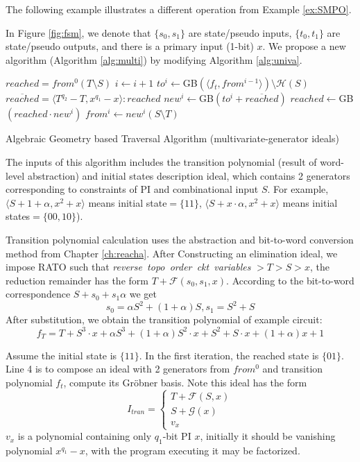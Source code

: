 The following example illustrates a different operation from Example \ref{ex:SMPO}.
\begin{Example}
In Figure \ref{fig:fsm}, we denote that
$\{s_0, s_1\}$ are state/pseudo inputs, $\{t_0,t_1\}$ are state/pseudo outputs, and there is a primary input (1-bit) 
$x$. We propose a new algorithm (Algorithm \ref{alg:multi}) by modifying Algorithm \ref{alg:univa}.

\IncMargin{1em}
\begin{algorithm}[hbt]
\SetAlgoNoLine
\LinesNumbered
  $reached = from^0(T\setminus S)$\;
  {
  	$i \gets i + 1$\;
	$to^i \gets$GB$(\langle f_t, from^{i-1}\rangle) \setminus \mathcal H(S)$\;
	$\overline{reached} = \langle T^{q_2}-T, x^{q_1} - x \rangle : reached$\;
	$new^i \gets $GB$(to^i + \overline{reached})$\;
  	$reached \gets $GB$( reached \cdot new^i)$\;
	$from^i \gets new^i(S\setminus T)$\;
  }
\caption {Algebraic Geometry based Traversal Algorithm (multivariate-generator ideals)}\label{alg:multi}
\end{algorithm}
\DecMargin{1em}

The inputs of this algorithm includes the transition polynomial (result of word-level abstraction) and initial 
states description ideal, which contains 2 generators corresponding to constraints of PI and combinational input $S$. 
For example, $\langle S+1+\alpha, x^2+x\rangle$ means initial state$=\{11\}$,
$\langle S+x\cdot\alpha, x^2+x\rangle$ means initial states$=\{00,10\}$).

Transition polynomial calculation uses the abstraction and bit-to-word conversion method from 
Chapter \ref{ch:reacha}. After Constructing
an elimination ideal, we impose RATO such that \textit{reverse\ topo\ order\ ckt\ variables }$> T > S > x$, the reduction
remainder has the form $T+\mathcal F(s_0,s_1,x)$. According to the bit-to-word correspondence $S+s_0+s_1\alpha$ we get
$$s_0 = \alpha S^2+ (1+\alpha)S, s_1 = S^2+S$$
After substitution, we obtain the transition polynomial of example circuit: 
$$f_T = T+S^3\cdot x+\alpha S^3+(1+\alpha)S^2\cdot x+S^2+S\cdot x+(1+\alpha)x+1$$

Assume the initial state is $\{11\}$. In the first iteration, the reached state is $\{01\}$. Line 4 is to compose an
ideal with 2 generators from $from^0$ and transition polynomial $f_t$, compute its Gr\"obner basis. Note this ideal
has the form
\begin{equation}
I_{tran} = \left\{
             \begin{array}{c}
             T+\mathcal F(S,x) \\
             S + \mathcal G(x) \\
             v_x
             \end{array}  
        \right.
\end {equation}
$v_x$ is a polynomial containing only $q_1$-bit PI $x$, initially it should be vanishing polynomial $x^{q_1}-x$, 
with the program executing it may be factorized.


\end{Example}
